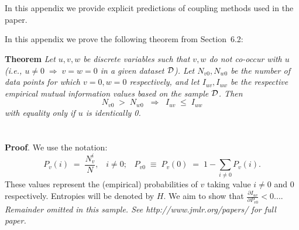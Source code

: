 \documentclass[twoside,11pt]{article}
\newcommand{\dataset}{{\cal D}}
\newcommand{\fracpartial}[2]{\frac{\partial #1}{\partial  #2}}
\begin{document}


\newpage

\appendix
\section{}
\label{app:explicit}



In this appendix we provide explicit predictions of coupling methods used in the paper.



In this appendix we prove the following theorem from
Section~6.2:

\noindent
{\bf Theorem} {\it Let $u,v,w$ be discrete variables such that $v, w$ do
not co-occur with $u$ (i.e., $u\neq0\;\Rightarrow \;v=w=0$ in a given
dataset $\dataset$). Let $N_{v0},N_{w0}$ be the number of data points for
which $v=0, w=0$ respectively, and let $I_{uv},I_{uw}$ be the
respective empirical mutual information values based on the sample
$\dataset$. Then
\[
	N_{v0} \;>\; N_{w0}\;\;\Rightarrow\;\;I_{uv} \;\leq\;I_{uw}
\]
with equality only if $u$ is identically 0.} \hfill\BlackBox

\section{}

\noindent
{\bf Proof}. We use the notation:
\[
P_v(i) \;=\;\frac{N_v^i}{N},\;\;\;i \neq 0;\;\;\;
P_{v0}\;\equiv\;P_v(0)\; = \;1 - \sum_{i\neq 0}P_v(i).
\]
These values represent the (empirical) probabilities of $v$
taking value $i\neq 0$ and 0 respectively.  Entropies will be denoted
by $H$. We aim to show that $\fracpartial{I_{uv}}{P_{v0}} < 0$....\\

{\noindent \em Remainder omitted in this sample. See http://www.jmlr.org/papers/ for full paper.}


\vskip 0.2in 

\end{document}
